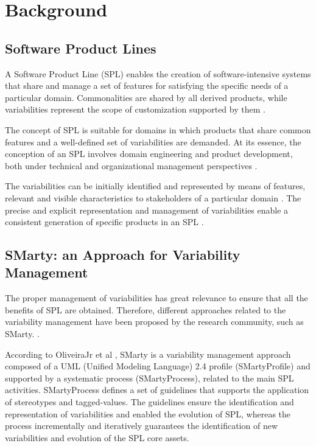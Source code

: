 \section{Background}\label{section2}


\subsection{Software Product Lines}

A Software Product Line (SPL) enables the creation of software-intensive systems that share and manage a set of features for satisfying the specific needs of a particular domain. Commonalities are shared by all derived products, while variabilities represent the scope of customization supported by them \cite{bockle05,vanderlinden07}.

The concept of SPL is suitable for domains in which products that share common features and a well-defined set of variabilities are demanded. At its essence, the conception of an SPL involves domain engineering and product development, both under technical and organizational management perspectives \cite{bockle05,vanderlinden07}.

The variabilities can be initially identified and represented by means of features, relevant and visible characteristics to stakeholders of a particular domain \cite{bosch01}. The precise and explicit representation and management of variabilities enable a consistent generation of specific products in an SPL \cite{chen11,galster2014}. 

\subsection{SMarty: an Approach for Variability Management}

The proper management of variabilities has great relevance to ensure that all the benefits of SPL are obtained. Therefore, different approaches related to the variability management have been proposed by the research community, such as SMarty.  \cite{chen11,capilla13}.  

According to OliveiraJr et al \cite{oliveirajr10}, SMarty is a variability management approach composed of a UML (Unified Modeling Language) 2.4 profile (SMartyProfile) and supported by a systematic process (SMartyProcess), related to the main SPL activities. SMartyProcess defines a set of guidelines that supports the application of stereotypes and tagged-values. The guidelines ensure the identification and representation of variabilities and enabled the evolution of SPL, whereas the process incrementally and iteratively guarantees the identification of new variabilities and evolution of the SPL core assets.

